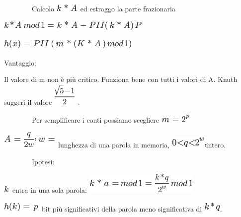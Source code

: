 \documentclass{article}
\begin{document}
{~~~~~~~~Calcolo }\includegraphics{images/image262.png}{~ed estraggo la
parte frazionaria}

\includegraphics{images/image263.png}

\includegraphics{images/image264.png}

{}

{Vantaggio:}

{Il valore di m non è più critico. Funziona bene con tutti i valori di
A. Knuth suggerì il valore }\includegraphics{images/image265.png}{~.}

{}

{~~~~~~~~Per semplificare i conti possiamo scegliere
}\includegraphics{images/image266.png}

\includegraphics{images/image267.png}{~lunghezza di una parola
in memoria, }\includegraphics{images/image268.png}{intero.}

{}

{~~~~~~~~Ipotesi:}

\includegraphics{images/image118.png}{~entra in una
sola parola: }\includegraphics{images/image269.png}

\includegraphics{images/image270.png}{~bit più
significativi della parola meno significativa di
}\includegraphics{images/image271.png}{.}
\end{document}
